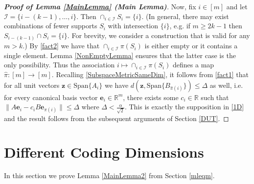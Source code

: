 \documentclass[journal, onecolumn]{IEEEtran}
\begin{document}
\begin{proof}[\textbf{Proof of Lemma \ref{MainLemma} (Main Lemma)}]
Now, fix $i \in [m]$ and let $\mathcal{I} = \{i-(k-1), \ldots, i\}$. Then $\cap_{i \in \mathcal{I}} S_i = \{i\}$. (In general, there may exist combinations of fewer supports $S_i$ with intersection $\{i\}$, e.g. if $m \geq 2k-1$ then $S_{i - (k-1)} \cap S_i = \{i\}$. For brevity, we consider a construction that is valid for any $m > k$.) By \eqref{fact2} we have that $\cap_{i \in \mathcal{I}} \pi(S_i)$ is either empty or it contains a single element. Lemma \ref{NonEmptyLemma} ensures that the latter case is the only possibility. Thus the association $i \mapsto \cap_{i \in \mathcal{I}} \pi(S_i)$ defines a map $\hat \pi: [m] \to [m]$. Recalling \eqref{SubspaceMetricSameDim}, it follows from \eqref{fact1} that for all unit vectors $\mathbf{z} \in \text{Span}\{A_{i}\}$ we have $d\left( \mathbf{z}, \text{Span}\{B_{\hat \pi(i)}\}\right) \leq \Delta$ as well, i.e. for every canonical basis vector $\mathbf{e}_i \in \mathbb{R}^m$, there exists some $c_i \in \mathbb{R}$ such that $\|A\mathbf{e}_i - c_iB\mathbf{e}_{\hat \pi(i)}\| \leq \Delta$ where $\Delta < \frac{\alpha}{\sqrt{2}}$. This is exactly the supposition in \eqref{1D} and the result follows from the subsequent arguments of Section \ref{DUT}. 
\end{proof}


\section{Different Coding Dimensions}

In this section we prove Lemma \ref{MainLemma2} from Section \ref{mleqm}.

\end{document}

